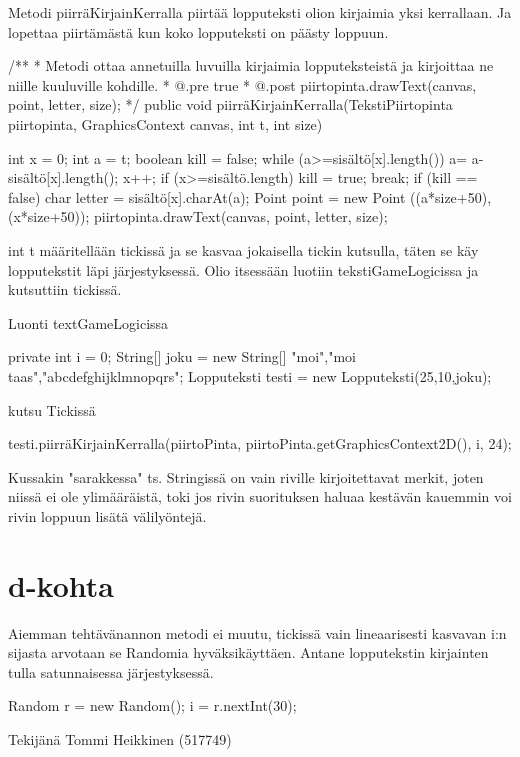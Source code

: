 Metodi piirräKirjainKerralla piirtää lopputeksti olion kirjaimia yksi kerrallaan. Ja lopettaa piirtämästä
kun koko lopputeksti on päästy loppuun.
\begin{javacode}
/**
     * Metodi ottaa annetuilla luvuilla kirjaimia lopputeksteistä ja kirjoittaa ne niille kuuluville kohdille.
     * @.pre true
     * @.post piirtopinta.drawText(canvas, point, letter, size);
     */
    public void piirräKirjainKerralla(TekstiPiirtopinta piirtopinta, GraphicsContext canvas, int t, int size) {
      int x = 0;
      int a = t;
      boolean kill = false;
      while (a>=sisältö[x].length()) {
        a= a-sisältö[x].length();
        x++;
        if (x>=sisältö.length) {
          kill = true;
          break;
        }
      }
      if (kill == false) {
        char letter = sisältö[x].charAt(a);
        Point point = new Point ((a*size+50),(x*size+50));
        piirtopinta.drawText(canvas, point, letter, size);
      }
      
    }
\end{javacode}
int t määritellään tickissä ja se kasvaa jokaisella tickin kutsulla, täten se käy lopputekstit läpi
järjestyksessä. Olio itsessään luotiin tekstiGameLogicissa ja kutsuttiin tickissä.

Luonti textGameLogicissa
\begin{javacode}
  private int i = 0;
    String[] joku = new String[] {"moi","moi taas","abcdefghijklmnopqrs"};
    Lopputeksti testi = new Lopputeksti(25,10,joku);
\end{javacode}

kutsu Tickissä
\begin{javacode}
testi.piirräKirjainKerralla(piirtoPinta, piirtoPinta.getGraphicsContext2D(), i, 24);
\end{javacode}

Kussakin "sarakkessa" ts. Stringissä on vain riville kirjoitettavat merkit, joten niissä ei ole ylimääräistä,
toki jos rivin suorituksen haluaa kestävän kauemmin voi rivin loppuun lisätä välilyöntejä.
\section{d-kohta}
\label{d-kohta}

Aiemman tehtävänannon metodi ei muutu, tickissä vain lineaarisesti kasvavan i:n sijasta arvotaan se Randomia
hyväksikäyttäen. Antane lopputekstin kirjainten tulla satunnaisessa järjestyksessä.
\begin{javacode}
  Random r = new Random();
      i = r.nextInt(30);
\end{javacode}



Tekijänä Tommi Heikkinen (517749)
